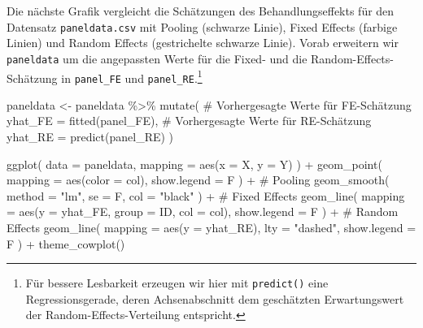 \documentclass[
  a4paper,
  DIV=11,
  oneside]{scrreprt}
\newenvironment{Shaded}{\begin{snugshade}}{\end{snugshade}}
\newcommand{\AttributeTok}[1]{\textcolor[rgb]{0.40,0.45,0.13}{#1}}
\newcommand{\CommentTok}[1]{\textcolor[rgb]{0.37,0.37,0.37}{#1}}
\newcommand{\FunctionTok}[1]{\textcolor[rgb]{0.28,0.35,0.67}{#1}}
\newcommand{\NormalTok}[1]{\textcolor[rgb]{0.00,0.23,0.31}{#1}}
\newcommand{\OtherTok}[1]{\textcolor[rgb]{0.00,0.23,0.31}{#1}}
\newcommand{\SpecialCharTok}[1]{\textcolor[rgb]{0.37,0.37,0.37}{#1}}
\newcommand{\StringTok}[1]{\textcolor[rgb]{0.13,0.47,0.30}{#1}}
\begin{document}
Die nächste Grafik vergleicht die Schätzungen des Behandlungseffekts für
den Datensatz \texttt{paneldata.csv} mit Pooling (schwarze Linie), Fixed
Effects (farbige Linien) und Random Effects (gestrichelte schwarze
Linie). Vorab erweitern wir \texttt{paneldata} um die angepassten Werte
für die Fixed- und die Random-Effects-Schätzung in \texttt{panel\_FE}
und \texttt{panel\_RE}.\footnote{Für bessere Lesbarkeit erzeugen wir
  hier mit \texttt{predict()} eine Regressionsgerade, deren
  Achsenabschnitt dem geschätzten Erwartungswert der
  Random-Effects-Verteilung entspricht.}

\begin{Shaded}
\begin{Highlighting}[]
\NormalTok{paneldata }\OtherTok{\textless{}{-}}\NormalTok{ paneldata }\SpecialCharTok{\%\textgreater{}\%} 
  \FunctionTok{mutate}\NormalTok{(}
    \CommentTok{\# Vorhergesagte Werte für FE{-}Schätzung}
    \AttributeTok{yhat\_FE =} \FunctionTok{fitted}\NormalTok{(panel\_FE),}
    \CommentTok{\# Vorhergesagte Werte für RE{-}Schätzung}
    \AttributeTok{yhat\_RE =} \FunctionTok{predict}\NormalTok{(panel\_RE)}
\NormalTok{  )}
\end{Highlighting}
\end{Shaded}

\begin{Shaded}
\begin{Highlighting}[]
\FunctionTok{ggplot}\NormalTok{(}
  \AttributeTok{data =}\NormalTok{ paneldata,}
  \AttributeTok{mapping =} \FunctionTok{aes}\NormalTok{(}\AttributeTok{x =}\NormalTok{ X, }\AttributeTok{y =}\NormalTok{ Y)}
\NormalTok{) }\SpecialCharTok{+}
  \FunctionTok{geom\_point}\NormalTok{(}
    \AttributeTok{mapping =} \FunctionTok{aes}\NormalTok{(}\AttributeTok{color =}\NormalTok{ col), }
    \AttributeTok{show.legend =}\NormalTok{ F}
\NormalTok{  ) }\SpecialCharTok{+}
  \CommentTok{\# Pooling}
  \FunctionTok{geom\_smooth}\NormalTok{(}
    \AttributeTok{method =} \StringTok{"lm"}\NormalTok{, }
    \AttributeTok{se =}\NormalTok{ F,}
    \AttributeTok{col =} \StringTok{"black"}
\NormalTok{  ) }\SpecialCharTok{+}
  \CommentTok{\# Fixed Effects}
  \FunctionTok{geom\_line}\NormalTok{(}
    \AttributeTok{mapping =} \FunctionTok{aes}\NormalTok{(}\AttributeTok{y =}\NormalTok{ yhat\_FE, }\AttributeTok{group =}\NormalTok{ ID, }\AttributeTok{col =}\NormalTok{ col), }
    \AttributeTok{show.legend =}\NormalTok{ F}
\NormalTok{  ) }\SpecialCharTok{+}
  \CommentTok{\# Random Effects}
  \FunctionTok{geom\_line}\NormalTok{(}
    \AttributeTok{mapping =} \FunctionTok{aes}\NormalTok{(}\AttributeTok{y =}\NormalTok{ yhat\_RE), }
    \AttributeTok{lty =} \StringTok{"dashed"}\NormalTok{, }
    \AttributeTok{show.legend =}\NormalTok{ F}
\NormalTok{  ) }\SpecialCharTok{+}
  \FunctionTok{theme\_cowplot}\NormalTok{()}
\end{Highlighting}
\end{Shaded}
\end{document}
